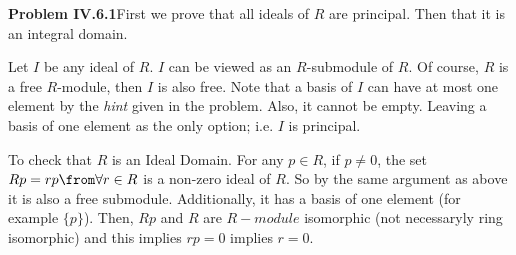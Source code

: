 \textbf{Problem IV.6.1}First we prove that all ideals of $R$ are principal. Then that it is an integral domain. 

Let $I$ be any ideal of $R$. $I$ can be viewed as an $R$-submodule of $R$. 
Of course, $R$ is a free $R$-module, then $I$ is also free.
Note that a basis of $I$ can have at most one element by the \emph{hint} given in the problem. 
Also, it cannot be empty. Leaving a basis of one element as the only option; i.e. $I$ is principal.

To check that $R$ is an Ideal Domain. 
For any $p\in R$, if $p\neq 0$, the set $Rp={rp\from \forall r\in R}$ is a non-zero ideal of $R$. 
So by the same argument as above it is also a free submodule. Additionally, it 
has a basis of one element (for example $\{p \}$). 
Then, $Rp$ and $R$  are $R-module$ isomorphic (not necessaryly ring isomorphic) and this implies $rp=0$ implies $r=0$. \\[1em]
